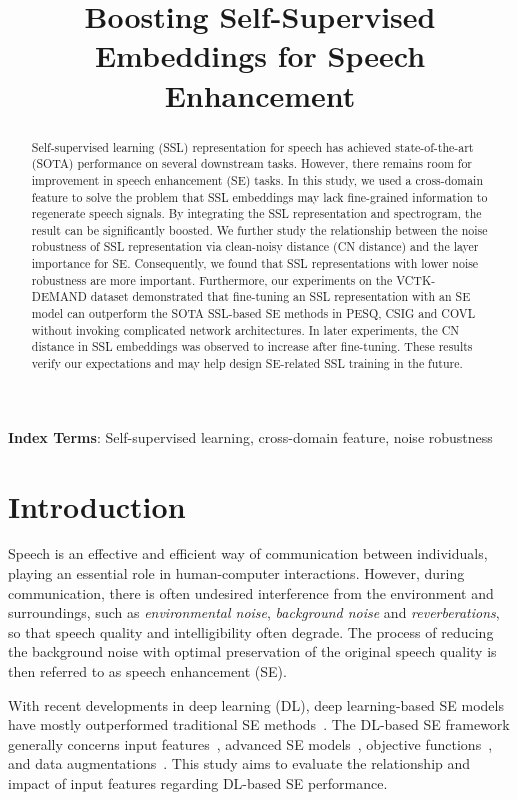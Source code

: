 \documentclass[a4paper]{article}
\title{Boosting Self-Supervised Embeddings for Speech Enhancement}
\begin{document}
\maketitle{}

\begin{abstract}
 Self-supervised learning (SSL) representation for speech has achieved state-of-the-art (SOTA) performance on several downstream tasks. However, there remains room for improvement in speech enhancement (SE) tasks. In this study, we used a cross-domain feature to solve the problem that SSL embeddings may lack fine-grained information to regenerate speech signals. By integrating the SSL representation and spectrogram, the result can be significantly boosted. We further study the relationship between the noise robustness of SSL representation via clean-noisy distance (CN distance) and the layer importance for SE. Consequently, we found that SSL representations with lower noise robustness are more important. Furthermore, our experiments on the VCTK-DEMAND dataset demonstrated that fine-tuning an SSL representation with an SE model can outperform the SOTA SSL-based SE methods in PESQ, CSIG and COVL without invoking complicated network architectures. In later experiments, the CN distance in SSL embeddings was observed to increase after fine-tuning. These results verify our expectations and may help design SE-related SSL training in the future.
 
\end{abstract}


\noindent\textbf{Index Terms}: Self-supervised learning, cross-domain feature, noise robustness



\section{Introduction}
Speech is an effective and efficient way of communication between individuals, playing an essential role in human-computer interactions. However, during communication, there is often undesired interference from the environment and surroundings, such as \textit{environmental noise}, \textit{background noise} and \textit{reverberations}, so that speech quality and intelligibility often degrade. The process of reducing the background noise with optimal preservation of the original speech quality is then referred to as speech enhancement (SE).




With recent developments in deep learning (DL), deep learning-based SE models have mostly outperformed traditional SE methods~\cite{xu2014regression,lu2013speech, wang2018supervised}. 
The DL-based SE framework generally concerns input features~\cite{wang2021speech}, advanced SE models~\cite{valin2020perceptually, choi2018phase,qi2020tensor}, objective functions~\cite{kumar2016speech, sivaraman2021personalized}, and data augmentations~\cite{kim2021specmix}. This study aims to evaluate the relationship and impact of input features regarding DL-based SE performance.
\end{document}
